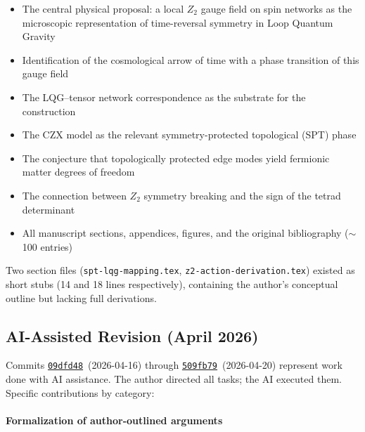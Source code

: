 \documentclass[preprint]{SciPost}
\theoremstyle{plain} %
\begin{document}
\begin{itemize}
\item The central physical proposal: a local $Z_2$ gauge field on spin networks as the microscopic representation of time-reversal symmetry in Loop Quantum Gravity
\item Identification of the cosmological arrow of time with a phase transition of this gauge field
\item The LQG--tensor network correspondence as the substrate for the construction
\item The CZX model as the relevant symmetry-protected topological (SPT) phase
\item The conjecture that topologically protected edge modes yield fermionic matter degrees of freedom
\item The connection between $Z_2$ symmetry breaking and the sign of the tetrad determinant
\item All manuscript sections, appendices, figures, and the original bibliography ($\sim$100 entries)
\end{itemize}

Two section files (\texttt{spt-lqg-mapping.tex}, \texttt{z2-action-derivation.tex}) existed as short stubs (14 and 18 lines respectively), containing the author's conceptual outline but lacking full derivations.

\subsection*{AI-Assisted Revision (April 2026)}

Commits \href{https://github.com/space-cadet/timesarrow/commit/09dfd48}{\texttt{09dfd48}}~(2026-04-16) through \href{https://github.com/space-cadet/timesarrow/commit/509fb79}{\texttt{509fb79}}~(2026-04-20) represent work done with AI assistance. The author directed all tasks; the AI executed them. Specific contributions by category:

\paragraph{Formalization of author-outlined arguments}
\end{document}

